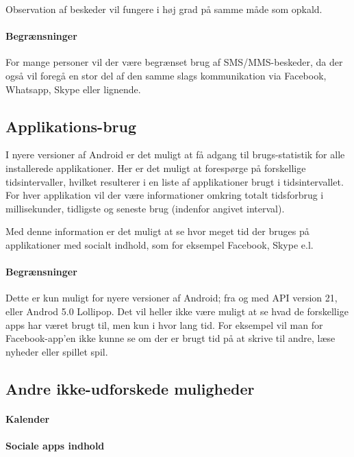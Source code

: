 Observation af beskeder vil fungere i høj grad på samme måde som opkald.

\paragraph{Begrænsninger}
For mange personer vil der være begrænset brug af SMS/MMS-beskeder, da der også vil foregå en stor del af den samme slags kommunikation via Facebook, Whatsapp, Skype eller lignende.

\subsection{Applikations-brug}
I nyere versioner af Android er det muligt at få adgang til brugs-statistik for alle installerede applikationer.
Her er det muligt at forespørge på forskellige tidsintervaller, hvilket resulterer i en liste af applikationer brugt i tidsintervallet.
For hver applikation vil der være informationer omkring totalt tidsforbrug i millisekunder, tidligste og seneste brug (indenfor angivet interval).

Med denne information er det muligt at se hvor meget tid der bruges på applikationer med socialt indhold, som for eksempel Facebook, Skype e.l.

\paragraph{Begrænsninger}
Dette er kun muligt for nyere versioner af Android; fra og med API version 21, eller Androd 5.0 Lollipop.
Det vil heller ikke være muligt at se hvad de forskellige apps har været brugt til, men kun i hvor lang tid.
For eksempel vil man for Facebook-app'en ikke kunne se om der er brugt tid på at skrive til andre, læse nyheder eller spillet spil.

\subsection{Andre ikke-udforskede muligheder}

\paragraph{Kalender}

\paragraph{Sociale apps indhold}
